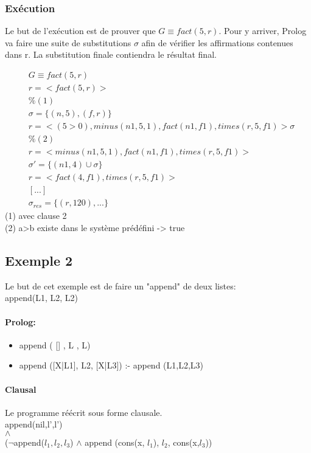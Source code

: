 \subsubsection{Exécution} 
Le but de l'exécution est de prouver que $G \equiv fact(5, r)$. Pour y arriver, Prolog va faire une suite de substitutions $\sigma$ afin de vérifier les affirmations contenues dans r. La substitution finale contiendra le résultat final.

\begin{align*}
& G \equiv fact(5,r) \\
& r= < fact(5, r) > \\
& \% (1) \\
& \sigma = \{ (n, 5), (f, r) \} \\
& r= < ( 5>0 ), minus(n1, 5, 1), fact(n1, f1), times(r, 5, f1) > \sigma \\
& \% (2) \\
& r= < minus(n1, 5, 1), fact(n1, f1), times(r, 5, f1) > \\
& \sigma'= \{ (n1, 4) \cup \sigma\} \\
& r= < fact (4, f1), times(r, 5, f1) > \\
& [...]\\
& \sigma_{res} = \{(r,120),...\} 
\end{align*}
(1) avec clause 2\\
(2) a>b existe dans le système prédéfini -> true\\

\subsection{Exemple 2}

Le but de cet exemple est de faire un "append" de deux listes:\\
append(L1, L2, L2)
\paragraph{Prolog:}
\begin{itemize}
\item append ( [] , L , L)
\item append ([X|L1], L2, [X|L3]) :- append (L1,L2,L3)
\end{itemize}
\paragraph{Clausal}
Le programme réécrit sous forme clausale.\\
append(nil,l',l')\\
$\land$\\
($\neg$append($l_1,l_2,l_3$) $\land$ append (cons(x, $l_1$), $l_2$, cons(x,$l_3$))
